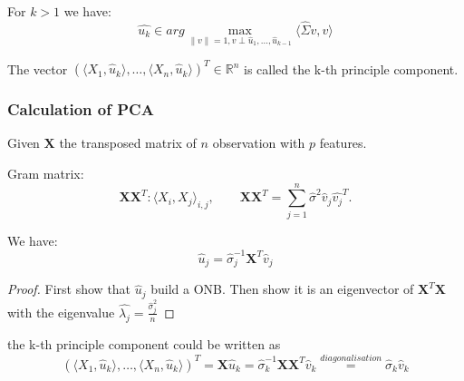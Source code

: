 \begin{theorem}
	For $k > 1$ we have:
	\begin{equation}
		\hat{u_k} \in  arg\max_{\|v\| = 1, v \perp \hat{u}_1, \dots, \hat{u}_{k - 1}} \langle \hat{\Sigma} v, v \rangle
	\end{equation}
\end{theorem}

\begin{definition}
	The vector $(\langle X_1, \hat{u}_k \rangle, \dots, \langle X_n, \hat{u}_k \rangle )^T \in \mathbb{R}^n$ is called the k-th principle component.
\end{definition}

\subsubsection*{Calculation of PCA}
Given $\mathbf{X}$ the transposed matrix of $n$ observation with $p$ features.

Gram matrix:
\[
	\mathbf{X} \mathbf{X}^T : \langle X_i, X_j \rangle_{i, j},
	\qquad
	\mathbf{X} \mathbf{X}^T  = \sum_{j = 1}^n \hat{\sigma}^2 \hat{v}_j \hat{v_j}^T .
\]



\begin{lemma}
	We have:
	\begin{equation*}
		\hat{u}_j = \hat{\sigma}_j^{-1} \mathbf{X}^T \hat{v}_j
	\end{equation*}
\end{lemma}

\begin{proof}
	First show that $\hat{u}_j$ build a ONB. Then show it is an eigenvector of $\mathbf{X}^T \mathbf{X}$ with the eigenvalue $\hat{\lambda_j} = \frac{\hat{\sigma}_j^2}{n}$
\end{proof}

\begin{corollary}
	the k-th principle component could be written as 
	\begin{equation} \label{PCA k.}
		(\langle X_1, \hat{u}_k \rangle, \dots, \langle X_n, \hat{u}_k \rangle)^T = \mathbf{X} \hat{u}_k = \hat{\sigma}_k^{-1} \mathbf{X} \mathbf{X}^T \hat{v}_k \overset{diagonalisation}{=} \hat{\sigma}_k \hat{v}_k
	\end{equation}
\end{corollary}

